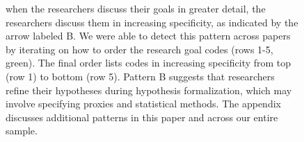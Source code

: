 {\begin{figure}
\begin{small}
\begin{minipage}{\linewidth}
            when the researchers discuss their goals in greater detail, the
            researchers discuss them in increasing specificity, as indicated by
            the arrow labeled B. We were able to detect this pattern across
            papers by iterating on how to order the research goal codes (rows
            1-5, green). The final order lists codes in increasing specificity
            from top (row 1) to bottom (row 5). Pattern B suggests that
            researchers refine their hypotheses during hypothesis formalization,
            which may involve specifying proxies and statistical methods.
            The appendix discusses additional patterns in this paper
            and across our entire sample. 
            \end{minipage}
        \end{small}
    \end{figure}
}